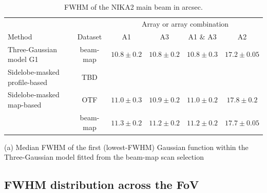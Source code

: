 \begin{table}[h]
  \caption[]{FWHM of the NIKA2 main beam in arcsec.}
  \centering
  \begin{threeparttable}
  \begin{tabular}{|l|c|c|c|c|c|}
    \hline
    
       &    &  \multicolumn{4}{|c|}{Array or array combination} \\
    \cline{3-6}
    Method & Dataset        &   A1 &  A3 & A1 $\&$ A3 &  A2  \\
    \hline
    \hline
    Three-Gaussian model G1\tnote{a} &  beam-map &  $10.8 \pm 0.2$  &  $10.8 \pm 0.2$  &  $10.8 \pm 0.3$  &  $17.2 \pm 0.05$  \\
    Sidelobe-masked profile-based    &  TBD      &    &    &    &   \\
    Sidelobe-masked map-based        &  OTF       & $11.0 \pm 0.3$  &  $10.9 \pm 0.2$  &  $11.0 \pm 0.2$  &  $17.8 \pm 0.2$ \\ 
                                     &  beam-map  & $11.3 \pm 0.2$  & $11.2 \pm 0.2$   &  $11.2 \pm 0.2$  &  $17.7 \pm 0.05$ \\ 
    \hline
  \end{tabular}
  \begin{tablenotes}
  \item[(a)] Median FWHM of the first (lowest-FWHM) Gaussian function
    within the Three-Gaussian model fitted from the beam-map scan selection 
  \end{tablenotes}
  \end{threeparttable}
  \label{tab:fwhm}
\end{table}

\subsection{FWHM distribution across the FoV}

